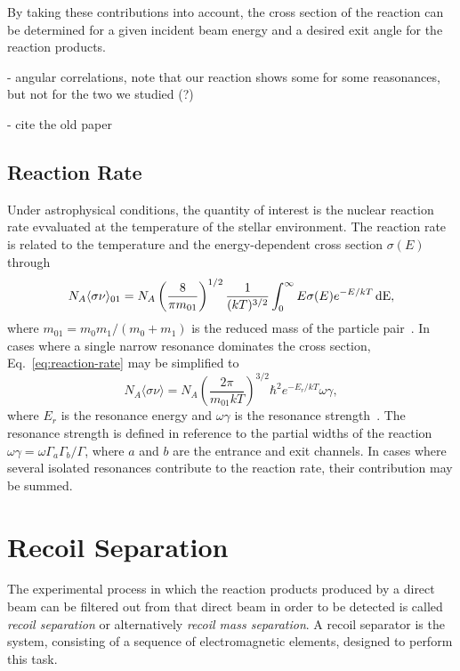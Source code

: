 By taking these contributions into account, the cross section of the reaction
can be determined for a given incident beam energy and a desired exit angle for
the reaction products.

- angular correlations, note that our reaction shows some for some reasonances,
  but not for the two we studied (?)

- cite the old paper

\subsection{Reaction Rate}
Under astrophysical conditions, the quantity of interest is the nuclear
reaction rate evvaluated at the temperature of the stellar environment. The
reaction rate is related to the temperature and the energy-dependent cross
section $\sigma(E)$ through
\begin{equation}
\label{eq:reaction-rate}
    N_A\langle\sigma\nu\rangle_{01} = N_A\left(\frac{8}{\pi m_{01}}\right)^{1/2}
        \frac{1}{(kT)^{3/2}}\int_0^{\infty} E\sigma(E)e^{-E/kT}\,\rm{d}E,
\end{equation}
where $m_{01} = m_0m_1/(m_0 + m_1)$ is the reduced mass of the particle
pair~\cite{Iliadis}. In cases where a single narrow resonance dominates the
cross section, Eq.~\ref{eq:reaction-rate} may be simplified to
\[
    N_A\langle\sigma\nu\rangle = N_A\left(\frac{2\pi}{m_{01}kT}\right)^{3/2}
        \hbar^2e^{-E_r/kT}\omega\gamma,
\]
where $E_r$ is the resonance energy and $\omega\gamma$ is the resonance
strength~\cite{Iliadis}. The resonance strength is defined in reference to the
partial widths of the reaction $\omega\gamma = \omega\Gamma_a\Gamma_b/\Gamma$,
where $a$ and $b$ are the entrance and exit channels. In cases where several
isolated resonances contribute to the reaction rate, their contribution may be
summed.



\section{Recoil Separation}
\label{sec:ch01-recoil-separation}

The experimental process in which the reaction products produced by a direct
beam can be filtered out from that direct beam in order to be detected is
called \emph{recoil separation} or alternatively \emph{recoil mass separation}.
A recoil separator is the system, consisting of a sequence of electromagnetic
elements, designed to perform this task.

